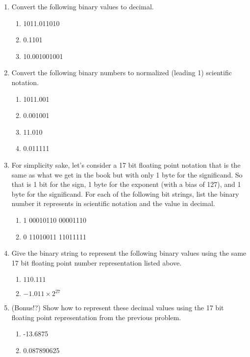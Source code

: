 \documentclass[nobib]{tufte-handout}
\begin{document}
\begin{enumerate}
    \item Convert the following binary values to decimal.
    \begin{enumerate}
        \item 1011.011010
        \vspace{2in}
        \item 0.1101
        \vspace{2in}
        \item 10.001001001
        \newpage \thispagestyle{empty}
    \end{enumerate}
    \item Convert the following binary numbers to normalized (leading 1) scientific notation. 
    \begin{enumerate}
        \item 1011.001 
        \vspace{2in}
        \item 0.001001
        \vspace{2in}
        \item 11.010
        \vspace{2in}
        \item 0.011111
        \newpage \thispagestyle{empty}        
    \end{enumerate}
    \item For simplicity sake, let's consider a 17 bit floating point notation that is the same as what we get in the book but with only 1 byte for the significand. So that is 1 bit for the sign, 1 byte for the exponent (with a bias of 127), and 1 byte for the significand. For each of the following bit strings, list the binary number it represents in scientific notation and the value in decimal. 
    \begin{enumerate}
        \item 1 00010110 00001110
        \vspace{2in}
        \item 0 11010011 11011111 
        \vspace{2in} 
    \end{enumerate} 
    \item Give the binary string to represent the following binary values using the same 17 bit floating point number representation listed above.
    \begin{enumerate}
        \item $110.111$
        \vspace{2in}
        \item $-1.011 \times 2^{27}$
        \newpage \thispagestyle{empty}
    \end{enumerate}
    \item (Bonus!?) Show how to represent these decimal values using the 17 bit floating point representation from the previous problem. 
    \begin{enumerate}
        \item -13.6875
        \vspace{2in}
        \item 0.087890625
    \end{enumerate}

\end{enumerate}
\end{document}
